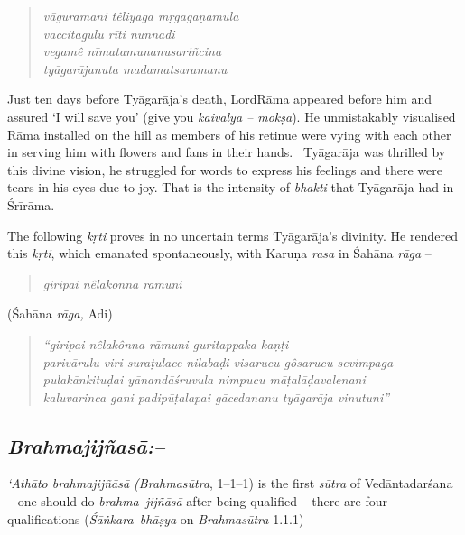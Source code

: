 \begin{verse}
\textit{vāguramani têliyaga mṛgagaṇamula}\\\textit{vaccitagulu rīti nunnadi}\\\textit{vegamê nīmatamunanusariñcina}\\\textit{tyāgarājanuta madamatsaramanu}
\end{verse}

Just ten days before Tyāgarāja’s death, LordRāma appeared before him and assured ‘I will save you’ (give you \textit{kaivalya – mokṣa}). He unmistakably visualised Rāma installed on the hill as members of his retinue were vying with each other in serving him with flowers and fans in their hands.  Tyāgarāja was thrilled by this divine vision, he struggled for words to express his feelings and there were tears in his eyes due to joy. That is the intensity of \textit{bhakti} that Tyāgarāja had in Śrīrāma.

The following \textit{kṛti} proves in no uncertain terms Tyāgarāja’s divinity. He rendered this \textit{kṛti}, which emanated spontaneously, with Karuṇa \textit{rasa} in Śahāna \textit{rāga} –

\begin{verse}
\textit{giripai nêlakonna rāmuni} 
\end{verse}

\begin{flushright}
(Śahāna \textit{rāga,} Ādi)
\end{flushright}

\begin{verse}
\textit{“giripai nêlakônna rāmuni guritappaka kaṇṭi} \\\textit{parivārulu viri suraṭulace nilabaḍi visarucu gôsarucu sevimpaga}\\\textit{pulakānkituḍai yānandāśruvula nimpucu māṭalāḍavalenani}\\\textit{kaluvarinca gani padipūṭalapai gācedananu tyāgarāja vinutuni”}
\end{verse}


\subsection*{\textit{Brahmajijñasā:–}}

\textit{‘Athāto brahmajijñāsā (Brahmasūtra}, 1–1–1) is the first \textit{sūtra} of Vedāntadarśana – one should do \textit{brahma–jijñāsā} after being qualified – there are four qualifications (\textit{Śāṅkara–bhāṣya} on \textit{Brahmasūtra} 1.1.1) –

